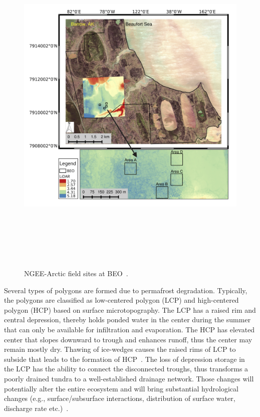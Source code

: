 \documentclass[review,11pt]{elsarticle}
\begin{document}
\begin{figure}[!h]
\centering
 \includegraphics[width=14cm, height=17cm]{./figures/ngee-arctic-fieldsites.png}
\caption{NGEE-Arctic field sites at BEO~\cite{kumar2016modeling}.}
\label{ngee-arctic-fieldsites}
\end{figure}
Several types of polygons are formed due to permafrost degradation. Typically, the polygons are classified as low-centered polygon (LCP) and high-centered polygon (HCP) based on surface microtopography. The LCP has a raised rim and central depression, thereby holds ponded water in the center during the summer that can only be available for infiltration and evaporation. The HCP has elevated center that slopes downward to trough and enhances runoff, thus the center may remain mostly dry. 
Thawing of ice-wedges causes the raised rims of LCP to subside that leads to the formation of HCP~\cite{jorgenson2006abrupt}. The loss of depression storage in the LCP has the ability to connect the disconnected troughs, thus transforms a poorly drained tundra to a well-established drainage network. Those changes will potentially alter the entire ecosystem and will bring substantial hydrological changes (e.g., surface/subsurface interactions, distribution of surface water, discharge rate etc.)~\cite{liljedahl2016pan, hinzman2005evidence,rowland2010arctic,liljedahl2012ice}.
\end{document}
